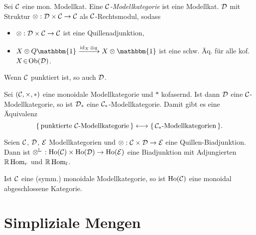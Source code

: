 \documentclass{cheat-sheet}
\DeclareMathOperator{\Ho}{Ho} %
\newcommand{\LD}[1]{\mathbb{L} #1} %
\newcommand{\RD}[1]{\mathbb{R} #1} %
\newcommand{\UnitOb}{\mathbbm{1}} %
\begin{document}
\begin{defn}
  Sei $\mathcal{C}$ eine mon. Modellkat.
  Eine \emph{$\mathcal{C}$-Modellkategorie} ist eine Modellkat. $\mathcal{D}$ mit Struktur $\otimes : \mathcal{D} \times \mathcal{C} \to \mathcal{C}$ als $\mathcal{C}$-Rechtsmodul, sodass
  \begin{itemize}
    \item $\otimes : \mathcal{D} \times \mathcal{C} \to \mathcal{C}$ ist eine Quillenadjunktion,
    \item $X \otimes Q \UnitOb \xrightarrow{\id_X \otimes q} X \otimes \UnitOb$ ist eine schw. Äq. für alle kof. $X \!\in\! \operatorname{Ob}(\mathcal{D})$.
  \end{itemize}
\end{defn}

\begin{bem}
  Wenn $\mathcal{C}$ punktiert ist, so auch $\mathcal{D}$.
\end{bem}

\begin{prop}
  Sei $(\mathcal{C}, {\times}, *)$ eine monoidale Modellkategorie und $*$ kofasernd.
  Ist dann $\mathcal{D}$ eine $\mathcal{C}$-Modellkategorie, so ist $\mathcal{D}_*$ eine $\mathcal{C}_*$-Modellkategorie.
  Damit gibt es eine Äquivalenz
  \[ \{\, \text{punktierte $\mathcal{C}$-Modellkategorie} \,\} \longleftrightarrow \{\, \text{$\mathcal{C}_*$-Modellkategorien} \,\}. \]
\end{prop}


\begin{prop}
  Seien $\mathcal{C}$, $\mathcal{D}$, $\mathcal{E}$ Modellkategorien und $\otimes : \Cat \times \Dat \to \Eat$ eine Quillen-Biadjunktion.
  Dann ist $\otimes^\LD{\,} : \Ho(\Cat) \times \Ho(\Dat) \to \Ho(\Eat)$ eine Biadjunktion mit Adjungierten $\RD{\Hom_r}$ und $\RD{\Hom_l}$.
\end{prop}

\iffalse
\begin{bem}
  Sei $\otimes : \Cat \times \Dat \to \Eat$ ein Quillen-Bifunktor.
  Ist dann $C \times I$ ein Zylinderobjekt zu $C \in \Ob(\Cat)$, so ist $(C \times I) \otimes D$ ein Zylinderobjekt zu $C \otimes D$, $D \in \Ob(\Dat)$.
\end{bem}
\fi

\begin{satz}
  Ist $\mathcal{C}$ eine (symm.) monoidale Modellkategorie, so ist $\Ho(\Cat)$ eine monoidal abgeschlossene Kategorie.
\end{satz}

\section{Simpliziale Mengen}
\end{document}
